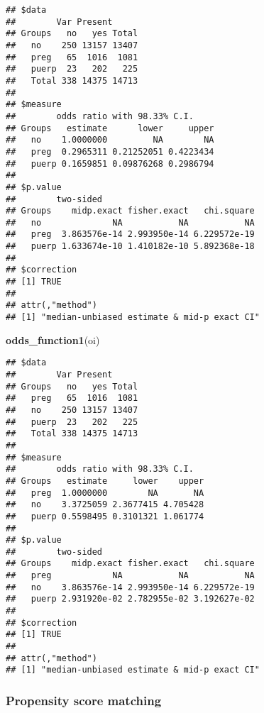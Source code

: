 \documentclass[
]{article}
\newenvironment{Shaded}{\begin{snugshade}}{\end{snugshade}}
\newcommand{\KeywordTok}[1]{\textcolor[rgb]{0.13,0.29,0.53}{\textbf{#1}}}
\newcommand{\NormalTok}[1]{#1}
\newcommand{\OperatorTok}[1]{\textcolor[rgb]{0.81,0.36,0.00}{\textbf{#1}}}
\newcommand{\StringTok}[1]{\textcolor[rgb]{0.31,0.60,0.02}{#1}}
\begin{document}
\begin{Shaded}
\end{Shaded}

\begin{verbatim}
## $data
##        Var Present
## Groups   no   yes Total
##   no    250 13157 13407
##   preg   65  1016  1081
##   puerp  23   202   225
##   Total 338 14375 14713
## 
## $measure
##        odds ratio with 98.33% C.I.
## Groups   estimate      lower     upper
##   no    1.0000000         NA        NA
##   preg  0.2965311 0.21252051 0.4223434
##   puerp 0.1659851 0.09876268 0.2986794
## 
## $p.value
##        two-sided
## Groups    midp.exact fisher.exact   chi.square
##   no              NA           NA           NA
##   preg  3.863576e-14 2.993950e-14 6.229572e-19
##   puerp 1.633674e-10 1.410182e-10 5.892368e-18
## 
## $correction
## [1] TRUE
## 
## attr(,"method")
## [1] "median-unbiased estimate & mid-p exact CI"
\end{verbatim}

\begin{Shaded}
\begin{Highlighting}[]
\KeywordTok{odds_function1}\NormalTok{(oi)}
\end{Highlighting}
\end{Shaded}

\begin{verbatim}
## $data
##        Var Present
## Groups   no   yes Total
##   preg   65  1016  1081
##   no    250 13157 13407
##   puerp  23   202   225
##   Total 338 14375 14713
## 
## $measure
##        odds ratio with 98.33% C.I.
## Groups   estimate     lower    upper
##   preg  1.0000000        NA       NA
##   no    3.3725059 2.3677415 4.705428
##   puerp 0.5598495 0.3101321 1.061774
## 
## $p.value
##        two-sided
## Groups    midp.exact fisher.exact   chi.square
##   preg            NA           NA           NA
##   no    3.863576e-14 2.993950e-14 6.229572e-19
##   puerp 2.931920e-02 2.782955e-02 3.192627e-02
## 
## $correction
## [1] TRUE
## 
## attr(,"method")
## [1] "median-unbiased estimate & mid-p exact CI"
\end{verbatim}

\hypertarget{propensity-score-matching}{%
\subsubsection{Propensity score
matching}\label{propensity-score-matching}}
\end{document}
